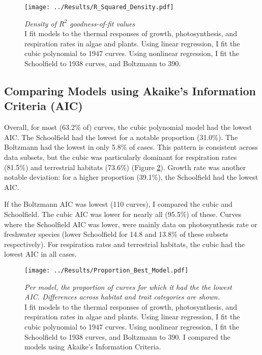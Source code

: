 \documentclass[11pt]{article}
\begin{document}
\begin{figure}[h]
	\centering
	\texttt{[image: ../Results/R\_Squared\_Density.pdf]}
	\caption{\textit{Density %
		of $R^{2}$ goodness-of-fit values}\\
	I fit models to the thermal responses of growth, photosynthesis, and respiration rates in algae and plants. Using linear regression, I fit the cubic polynomial to 1947 curves. Using nonlinear regression, I fit the Schoolfield to 1938 curves, and Boltzmann to 390.}
	\label{R2_density}
\end{figure}

\subsection*{Comparing Models using Akaike's Information Criteria (AIC)}

Overall, for most (63.2\% of) curves, the cubic polynomial model had the lowest AIC. The Schoolfield had the lowest for a notable proportion (31.0\%). The Boltzmann had the lowest in only 5.8\% of cases. This pattern is consistent across data subsets, but the cubic was particularly dominant for respiration rates (81.5\%) and terrestrial habitats (73.6\%) (Figure \ref{Proportion_best_model}).
Growth rate was another notable deviation: for a higher proportion (39.1\%), the Schoolfield had the lowest AIC.

If the Boltzmann AIC was lowest (110 curves), I compared the cubic and Schoolfield.
The cubic AIC was lower for nearly all (95.5\%) of these.
Curves where the Schoolfield AIC was lower, were mainly data on photosynthesis rate or freshwater species (lower Schoolfield for 14.8 and 13.8\% of these subsets respectively).
For respiration rates and terrestrial habitats, the cubic had the lowest AIC in all cases.

\begin{figure}[h]
	\centering
	\texttt{[image: ../Results/Proportion\_Best\_Model.pdf]}
	\caption{\textit{Per model, the proportion of curves for which it had the the lowest AIC. Differences across habitat and trait categories are shown.}\\
			I fit models to the thermal responses of growth, photosynthesis, and respiration rates in algae and plants. Using linear regression, I fit the cubic polynomial to 1947 curves. Using nonlinear regression, I fit the Schoolfield to 1938 curves, and Boltzmann to 390. I compared the models using Akaike's Information Criteria.
	}
	\label{Proportion_best_model}
\end{figure}
\end{document}
